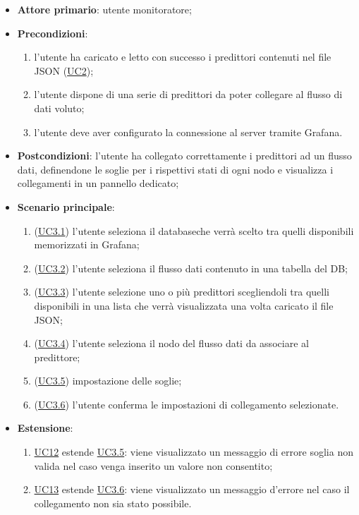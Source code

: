 		\begin{itemize}
			\item\textbf{Attore primario}: utente monitoratore;
			\item\textbf{Precondizioni}: 
				\begin{enumerate}
					\item l’utente ha caricato e letto con successo i predittori contenuti nel file JSON (\hyperref[par:UC2]{UC2});
					\item l’utente dispone di una serie di predittori da poter collegare al flusso di dati voluto;
					\item l’utente deve aver configurato la connessione al server tramite Grafana.	
				\end{enumerate}
			\item\textbf{Postcondizioni}: l’utente ha collegato correttamente i predittori ad un flusso dati, definendone le soglie per i rispettivi stati di ogni nodo e visualizza i collegamenti in un pannello dedicato;
			\item\textbf{Scenario principale}:
				\begin{enumerate}
					\item (\hyperref[par:UC3.1]{UC3.1}) l’utente seleziona il database\glo che verrà scelto tra quelli disponibili memorizzati in Grafana;
					\item (\hyperref[par:UC3.2]{UC3.2}) l’utente seleziona il flusso dati contenuto in una tabella del DB;
					\item (\hyperref[par:UC3.3]{UC3.3}) l'utente selezione uno o più predittori scegliendoli tra quelli disponibili in una lista che verrà visualizzata una volta caricato il file JSON; 
					\item (\hyperref[par:UC3.4]{UC3.4}) l'utente seleziona il nodo del flusso dati da associare al predittore;
					\item (\hyperref[par:UC3.5]{UC3.5}) impostazione delle soglie;
					\item (\hyperref[par:UC3.6]{UC3.6}) l'utente conferma le impostazioni di collegamento selezionate.	
				\end{enumerate}
			\item\textbf{Estensione}: 
				\begin{enumerate}
					\item\hyperref[par:UC12]{UC12} estende \hyperref[par:UC3.5]{UC3.5}: viene visualizzato un messaggio di errore soglia non valida nel caso venga inserito un valore non consentito;
					\item\hyperref[par:UC13]{UC13} estende \hyperref[par:UC3.6]{UC3.6}: viene visualizzato un messaggio d’errore nel caso il collegamento non sia stato possibile.

\end{enumerate}
\end{itemize}
